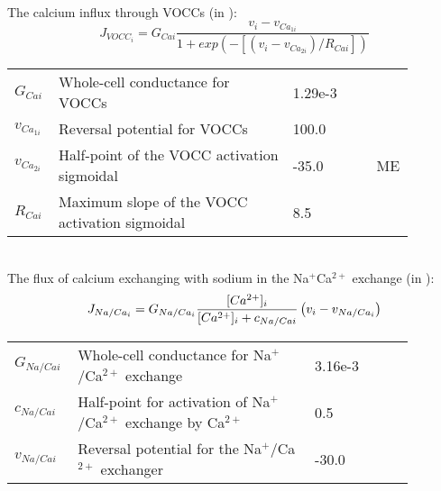 \\
%
\newpage
The calcium influx through VOCCs (in \uMs): 
\begin{equation} \label{eq:JVOCCi}
J_{VOCC_{i}} = G_{Cai} \frac{v_{i}-v_{Ca_{1i}}}     {1+ exp(-\left[ \left(  v_{i}-v_{Ca_{2i}}\right) /R_{Cai}      \right] )}
\end{equation}
\begin{table}[h!]
\centering
\begin{tabular}{| p{0.09\linewidth} | >{\footnotesize} p{0.57\linewidth} | >{\footnotesize} p{0.2\linewidth} | >{\footnotesize} p{0.02\linewidth} |}
\arrayrulecolor{lightgrey}\hline
$G_{Cai}$      	& Whole-cell conductance for VOCCs	 					& 1.29e-3  \uMpmVs					& \cite{Koenigsberger2006} \\
$v_{Ca_{1i}}$   & Reversal potential for VOCCs	 						& 100.0 \mV							& \cite{Koenigsberger2006} \\
$v_{Ca_{2i}}$  	& Half-point of the VOCC activation sigmoidal		 	& -35.0 \mV							& ME \\
$R_{Cai}$      	& Maximum slope of the VOCC	activation sigmoidal		& 8.5 \mV							& \cite{Koenigsberger2006} \\
\hline
\end{tabular}
\label{tab:JVOCCi}
\end{table}
\\
%
The flux of calcium exchanging with sodium in the Na$^{+}$Ca$^{2+}$ exchange (in \uMs): 
\begin{equation} \label{eq:JNaCai}
J_{Na/Ca_{i}} = G_{Na/Ca_{i}} \frac{[Ca^{2+}]_{i}}     {[Ca^{2+}]_{i} + c_{Na/Cai}} \left( v_{i}-v_{Na/Ca_{i}} \right)
\end{equation}
%
\begin{table}[h!]
\centering
\begin{tabular}{| p{0.09\linewidth} | >{\footnotesize} p{0.57\linewidth} | >{\footnotesize} p{0.2\linewidth} | >{\footnotesize} p{0.02\linewidth} |}
\arrayrulecolor{lightgrey}\hline
$G_{Na/Cai}$   	& Whole-cell conductance for Na$^{+}$/Ca$^{2+}$ exchange			 		 & 3.16e-3 \uMpmVs	& \cite{Koenigsberger2005} \\
$c_{Na/Cai}$   	& Half-point for activation of Na$^{+}$/Ca$^{2+}$ exchange by Ca$^{2+}$		 & 0.5 \uM			& \cite{Koenigsberger2006} \\
$v_{Na/Cai}$   	& Reversal potential for the Na$^{+}$/Ca$^{2+}$ exchanger					 & -30.0 \mV		& \cite{Koenigsberger2006} \\
\hline
\end{tabular}
\label{tab:JNaCai}
\end{table}
